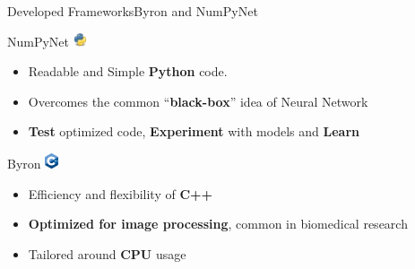 \documentclass[10pt, unicode]{beamer}
\begin{document}
\begin{frame}{Developed Frameworks}{Byron and NumPyNet}
 


    \begin{alertblock}{NumPyNet \hfill\includegraphics[width=0.03\textwidth]{images/python.png}}
    \begin{itemize}
      \item Readable and Simple \textbf{\textsf{Python}} code. 

      \item Overcomes the common ``\textbf{black-box}'' idea of Neural Network 
      
      \item \textbf{Test} optimized code, \textbf{Experiment} with models and \textbf{Learn} 

    \end{itemize}
  \end{alertblock} 
 


  \begin{alertblock}{Byron \hfill\includegraphics[width=0.03\textwidth]{images/cpp.png}}
    \begin{itemize}
      \item Efficiency and flexibility of \textbf{\textsf{C++}} 

      \item \textbf{Optimized for image processing}, common in biomedical research
      
      \item Tailored around \textbf{CPU} usage
    
    \end{itemize}
  \end{alertblock}
  

\end{frame}
\end{document}
